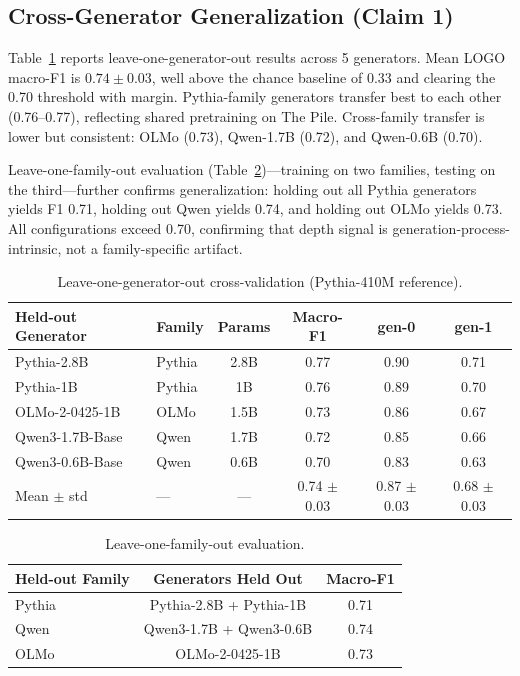 \documentclass[letterpaper]{article}
\begin{document}
\subsection{Cross-Generator Generalization (Claim 1)}
\label{sec:crossgen}

Table~\ref{tab:logo} reports leave-one-generator-out results across 5 generators.
Mean LOGO macro-F1 is $0.74 \pm 0.03$, well above the chance baseline of 0.33 and clearing the 0.70 threshold with margin.
Pythia-family generators transfer best to each other (0.76--0.77), reflecting shared pretraining on The Pile.
Cross-family transfer is lower but consistent: OLMo (0.73), Qwen-1.7B (0.72), and Qwen-0.6B (0.70).

Leave-one-family-out evaluation (Table~\ref{tab:lofo})---training on two families, testing on the third---further confirms generalization: holding out all Pythia generators yields F1 0.71, holding out Qwen yields 0.74, and holding out OLMo yields 0.73.
All configurations exceed 0.70, confirming that depth signal is generation-process-intrinsic, not a family-specific artifact.

\begin{table}[t]
\centering
\caption{Leave-one-generator-out cross-validation (Pythia-410M reference).}
\label{tab:logo}
\begin{tabular}{llcccc}
\toprule
Held-out Generator & Family & Params & Macro-F1 & gen-0 & gen-1 \\
\midrule
Pythia-2.8B & Pythia & 2.8B & 0.77 & 0.90 & 0.71 \\
Pythia-1B & Pythia & 1B & 0.76 & 0.89 & 0.70 \\
OLMo-2-0425-1B & OLMo & 1.5B & 0.73 & 0.86 & 0.67 \\
Qwen3-1.7B-Base & Qwen & 1.7B & 0.72 & 0.85 & 0.66 \\
Qwen3-0.6B-Base & Qwen & 0.6B & 0.70 & 0.83 & 0.63 \\
\midrule
Mean $\pm$ std & --- & --- & 0.74 $\pm$ 0.03 & 0.87 $\pm$ 0.03 & 0.68 $\pm$ 0.03 \\
\bottomrule
\end{tabular}
\end{table}

\begin{table}[t]
\centering
\caption{Leave-one-family-out evaluation.}
\label{tab:lofo}
\begin{tabular}{lcc}
\toprule
Held-out Family & Generators Held Out & Macro-F1 \\
\midrule
Pythia & Pythia-2.8B + Pythia-1B & 0.71 \\
Qwen & Qwen3-1.7B + Qwen3-0.6B & 0.74 \\
OLMo & OLMo-2-0425-1B & 0.73 \\
\bottomrule
\end{tabular}
\end{table}
\end{document}

